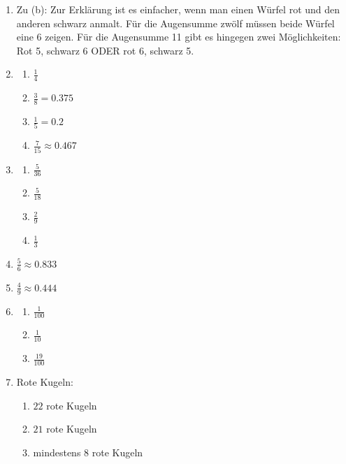 \begin{enumerate}
    \item Zu (b): Zur Erklärung ist es einfacher, wenn man einen Würfel rot und den anderen schwarz anmalt. Für die Augensumme zwölf müssen beide Würfel eine 6 zeigen. Für die Augensumme 11 gibt es hingegen zwei Möglichkeiten: Rot 5, schwarz 6 ODER rot 6, schwarz 5. 
    \item  
    \begin{enumerate}
        \item $\frac{1}{4}$
        \item $ \frac{3}{8} = 0.375$
        \item $ \frac{1}{5} = 0.2$
        \item$ \frac{7}{15} \approx 0.467$
    \end{enumerate}

    \item   \begin{enumerate}
         \item $ \frac{5}{36}$

        \item $ \frac{5}{18} $
        \item $ \frac{2}{9} $
        \item $\frac{1}{3}$
    \end{enumerate}
    \item  $ \frac{5}{6} \approx 0.833$
    \item $ \frac{4}{9} \approx 0.444$
    \item \begin{enumerate}
        \item $\frac{1}{100}$
        \item $\frac{1}{10}$
        \item $\frac{19}{100}$
    \end{enumerate}
    \item Rote Kugeln:
    \begin{enumerate}
        \item$22$ rote Kugeln
        \item $21$ rote Kugeln
        \item mindestens $8$ rote Kugeln
    \end{enumerate}
    
\end{enumerate}
\pagebreak





